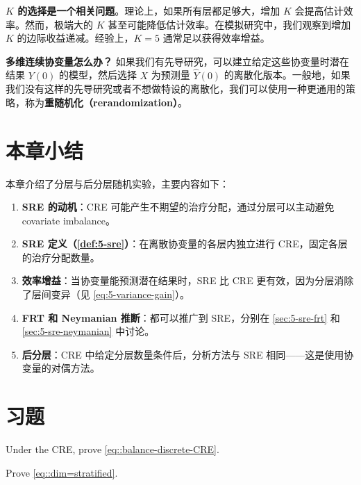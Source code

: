 \textbf{$K$ 的选择是一个相关问题}。理论上，如果所有层都足够大，增加 $K$ 会提高估计效率。然而，极端大的 $K$ 甚至可能降低估计效率。在模拟研究中，我们观察到增加 $K$ 的边际收益递减。经验上，$K = 5$ 通常足以获得效率增益。

\textbf{多维连续协变量怎么办？} 如果我们有先导研究，可以建立给定这些协变量时潜在结果 $Y(0)$ 的模型，然后选择 $X$ 为预测量 $\hat Y(0)$ 的离散化版本。一般地，如果我们没有这样的先导研究或者不想做特设的离散化，我们可以使用一种更通用的策略，称为\textbf{重随机化（rerandomization）}。

\section{本章小结}\label{sec:5-summary}

本章介绍了分层与后分层随机实验，主要内容如下：

\begin{enumerate}
  \item \textbf{SRE 的动机}：CRE 可能产生不期望的治疗分配，通过分层可以主动避免 covariate imbalance。
  \item \textbf{SRE 定义（\cref{def:5-sre}）}：在离散协变量的各层内独立进行 CRE，固定各层的治疗分配数量。
  \item \textbf{效率增益}：当协变量能预测潜在结果时，SRE 比 CRE 更有效，因为分层消除了层间变异（见 \cref{eq:5-variance-gain}）。
  \item \textbf{FRT 和 Neymanian 推断}：都可以推广到 SRE，分别在 \cref{sec:5-sre-frt} 和 \cref{sec:5-sre-neymanian} 中讨论。
  \item \textbf{后分层}：CRE 中给定分层数量条件后，分析方法与 SRE 相同——这是使用协变量的对偶方法。
\end{enumerate}

\section{习题}\label{sec:5-homework}

\begin{HomeworkProblem}\label{exr:5-1}

 Under the CRE, prove \eqref{eq::balance-discrete-CRE}.

\end{HomeworkProblem}

\begin{HomeworkProblem}\label{exr:5-2}

Prove \eqref{eq::dim=stratified}.


\end{HomeworkProblem}

